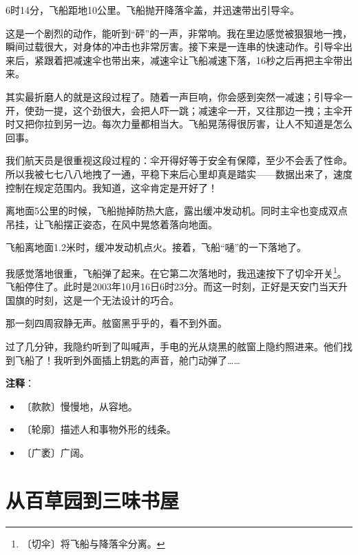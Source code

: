 \documentclass[12pt,UTF-8,openany]{ctexbook}
\begin{document}
\begin{large}
    6时14分，飞船距地10公里。飞船抛开降落伞盖，并迅速带出引导伞。
    
    这是一个剧烈的动作，能听到“砰”的一声，非常响。我在里边感觉被狠狠地一拽，瞬间过载很大，对身体的冲击也非常厉害。接下来是一连串的快速动作。引导伞出来后，紧跟着把减速伞也带出来，减速伞让飞船减速下落，16秒之后再把主伞带出来。
    
    其实最折磨人的就是这段过程了。随着一声巨响，你会感到突然一减速；引导伞一开，使劲一提，这个劲很大，会把人吓一跳；减速伞一开，又往那边一拽；主伞开时又把你拉到另一边。每次力量都相当大。飞船晃荡得很厉害，让人不知道是怎么回事。
    
    我们航天员是很重视这段过程的：伞开得好等于安全有保障，至少不会丢了性命。所以我被七七八八地拽了一通，平稳下来后心里却真是踏实——数据出来了，速度控制在规定范围内。我知道，这伞肯定是开好了！
    
    离地面5公里的时候，飞船抛掉防热大底，露出缓冲发动机。同时主伞也变成双点吊挂，让飞船摆正姿态，在风中晃悠着落向地面。
    
    飞船离地面1.2米时，缓冲发动机点火。接着，飞船“嗵”的一下落地了。
    
    我感觉落地很重，飞船弹了起来。在它第二次落地时，我迅速按下了切伞开关\footnote{〔切伞〕将飞船与降落伞分离。}。飞船停住了。此时是2003年10月16日6时23分。而这一时刻，正好是天安门当天升国旗的时刻，这是一个无法设计的巧合。
    
    那一刻四周寂静无声。舷窗黑乎乎的，看不到外面。
    
    过了几分钟，我隐约听到了叫喊声，手电的光从烧黑的舷窗上隐约照进来。他们找到飞船了！我听到外面插上钥匙的声音，舱门动弹了……
    
\end{large}


\newpage

\textbf{注释}：

\vspace{-1em}

\begin{itemize}
    \setlength\itemsep{-0.2em}
    \item 〔款款〕慢慢地，从容地。
    \item 〔轮廓〕描述人和事物外形的线条。
    \item 〔广袤〕广阔。
\end{itemize}

\chapter{从百草园到三味书屋}
\end{document}
